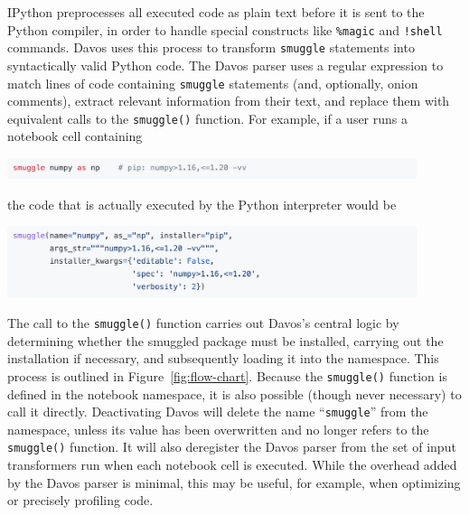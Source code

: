 \documentclass[preprint,12pt,a4paper]{elsarticle}
\begin{document}
IPython preprocesses all executed code as plain text before it is sent
to the Python compiler, in order to handle special constructs like
\texttt{\%magic} and \texttt{!shell} commands. Davos uses
this process to transform \texttt{smuggle} statements into
syntactically valid Python code. The Davos parser uses a
regular expression to match lines of code containing \texttt{smuggle}
statements (and, optionally, onion comments), extract relevant
information from their text, and replace them with equivalent calls to
the \texttt{smuggle()} function. For example, if a user runs a
notebook cell containing
\begin{center}
\includegraphics[width=0.9\textwidth]{figs/snippet6}
\end{center}
the code that is actually executed by the Python interpreter would be
\begin{center}
\includegraphics[width=0.9\textwidth]{figs/snippet7}
\end{center}
The call to the \texttt{smuggle()} function carries out
Davos's central logic by determining whether the smuggled
package must be installed, carrying out the installation if necessary,
and subsequently loading it into the namespace. This process is
outlined in Figure~\ref{fig:flow-chart}. Because the
\texttt{smuggle()} function is defined in the notebook namespace, it
is also possible (though never necessary) to call it
directly. Deactivating Davos will delete the name
``\texttt{smuggle}'' from the namespace, unless its value has been
overwritten and no longer refers to the \texttt{smuggle()}
function. It will also deregister the Davos parser from the
set of input transformers run when each notebook cell is
executed. While the overhead added by the Davos parser is
minimal, this may be useful, for example, when optimizing or precisely
profiling code.
\end{document}

